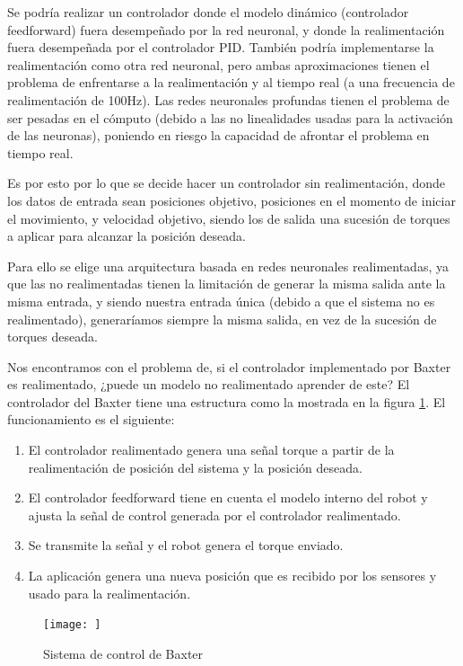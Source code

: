 Se podría realizar un controlador donde el modelo dinámico (controlador feedforward) fuera desempeñado por la red neuronal, y donde la realimentación fuera desempeñada por el controlador PID. También podría implementarse la realimentación como otra red neuronal, pero ambas aproximaciones tienen el problema de enfrentarse a la realimentación y al tiempo real (a una frecuencia de realimentación de 100Hz). Las redes neuronales profundas tienen el problema de ser pesadas en el cómputo (debido a las no linealidades usadas para la activación de las neuronas), poniendo en riesgo la capacidad de afrontar el problema en tiempo real.

Es por esto por lo que se decide hacer un controlador sin realimentación, donde los datos de entrada sean posiciones objetivo, posiciones en el momento de iniciar el movimiento, y velocidad objetivo, siendo los de salida una sucesión de torques a aplicar para alcanzar la posición deseada.

Para ello se elige una arquitectura basada en redes neuronales realimentadas, ya que las no realimentadas tienen la limitación de generar la misma salida ante la misma entrada, y siendo nuestra entrada única (debido a que el sistema no es realimentado), generaríamos siempre la misma salida, en vez de la sucesión de torques deseada.

Nos encontramos con el problema de, si el controlador implementado por Baxter es realimentado, ¿puede un modelo no realimentado aprender de este? %
El controlador del Baxter tiene una estructura como la mostrada en la figura \ref{fig:desarrollo/feedforward_controller}. El funcionamiento es el siguiente:

\begin{enumerate}
\item El controlador realimentado genera una señal torque a partir de la realimentación de posición del sistema y la posición deseada.
\item El controlador feedforward tiene en cuenta el modelo interno del robot y ajusta la señal de control generada por el controlador realimentado.
\item Se transmite la señal y el robot genera el torque enviado.
\item La aplicación genera una nueva posición que es recibido por los sensores y usado para la realimentación.
\end{enumerate}

\begin{figure}[]
	\centering
	\texttt{[image: ]}
	\caption{Sistema de control de Baxter}
	\label{fig:desarrollo/feedforward_controller}
\end{figure}

